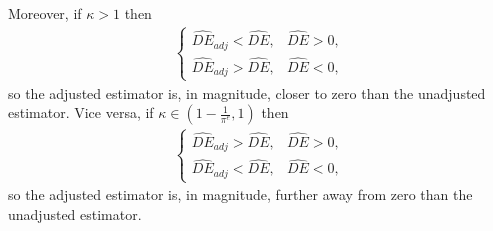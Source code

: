 \documentclass[11pt]{article}
\theoremstyle{definition}
\begin{document}
Moreover, if $\kappa > 1$ then
\begin{align*}
    \begin{cases}
        \widehat{DE}_{adj} < \widehat{DE}, & \widehat{DE} > 0, \\
        \widehat{DE}_{adj} > \widehat{DE}, & \widehat{DE} < 0,
    \end{cases}
\end{align*}
so the adjusted estimator is, in magnitude, closer to zero than the unadjusted estimator.
Vice versa, if $\kappa \in \left(1-\frac{1}{\pi^e}, 1\right)$ then
\begin{align*}
    \begin{cases}
        \widehat{DE}_{adj} > \widehat{DE}, & \widehat{DE} > 0, \\
        \widehat{DE}_{adj} < \widehat{DE}, & \widehat{DE} < 0,
    \end{cases}
\end{align*}
so the adjusted estimator is, in magnitude, further away from zero than the unadjusted estimator.
\end{document}
